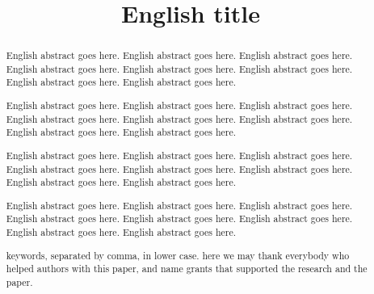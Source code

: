 \documentclass[intlimits,twoside,a4paper,11pt]{article}
\begin{document}
 





\begin{translatedpart}
\title{English title}



\maketranslatedtitle

\begin{abstract}
English abstract goes here. English abstract goes here. English abstract goes here. English abstract goes here.
English abstract goes here. English abstract goes here. English abstract goes here. English abstract goes here.

English abstract goes here. English abstract goes here. English abstract goes here. English abstract goes here.
English abstract goes here. English abstract goes here. English abstract goes here. English abstract goes here.


English abstract goes here. English abstract goes here. English abstract goes here. English abstract goes here.
English abstract goes here. English abstract goes here. English abstract goes here. English abstract goes here.

English abstract goes here. English abstract goes here. English abstract goes here. English abstract goes here.
English abstract goes here. English abstract goes here. English abstract goes here. English abstract goes here.

\keywords keywords, separated by comma, in lower case.
\autocitationexample
\acknowledgements here we may thank everybody who helped authors with this paper, and name grants that supported the research and the paper.
\end{abstract}


\end{translatedpart}

\makekioauthors
\end{document}

